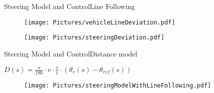 \begin{frame}{Steering Model and Control}{Line Following}
  \begin{minipage}{\linewidth}
    \begin{minipage}{0.35\linewidth}
      \begin{figure}[H]
        \centering
        \texttt{[image: Pictures/vehicleLineDeviation.pdf]}
      \end{figure}
    \end{minipage}
    \hspace{0.03\linewidth}
    \begin{minipage}{0.45\linewidth}
      \begin{figure}[H]
        \centering
        \texttt{[image: Pictures/steeringDeviation.pdf]}
      \end{figure}
    \end{minipage}
  \end{minipage}
\end{frame}


\begin{frame}{Steering Model and Control}{Distance model}

  $ D(s)= \frac{\pi}{180} \cdot v \cdot \frac{1}{s} \cdot \left(\theta_{v}(s) - \theta_{ref}(s)\right) $

  \begin{figure}[H]
    \centering
    \texttt{[image: Pictures/steeringModelWithLineFollowing.pdf]}
  \end{figure}
\end{frame}

